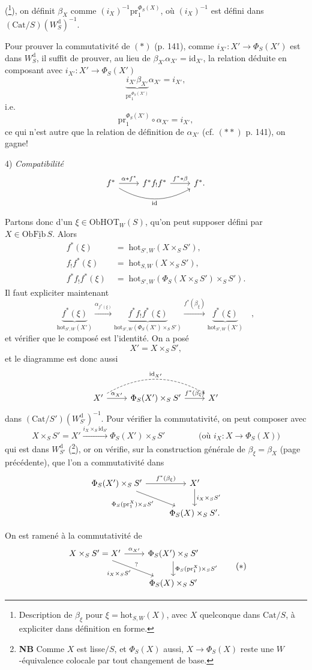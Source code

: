 \documentclass[11pt]{article}
\newcommand{\printedpage}[1]{\marginpar{\footnotesize p.~#1}}
\newcommand{\msp}[1]{\marginpar{\footnotesize [#1]}}
\newcommand{\HOT}{\mathrm{HOT}}
\newcommand{\Cat}{\mathrm{Cat}}
\newcommand{\Ob}{\mathrm{Ob}}
\newcommand{\id}{\mathrm{id}}
\newcommand{\hot}{\mathrm{hot}}
\newcommand{\pr}{\mathrm{pr}}
\newcommand{\Wd}{W^{\mathrm{d}}}
\begin{document}
(\footnote[70]{Description de $\beta_\xi$ pour $\xi=\hot_{S,W}(X)$, avec $X$ quelconque dans $\Cat/S$, à expliciter dans définition en forme.}), on définit $\beta_X$ comme $(i_X)^{-1}\pr_1^{\Phi_S(X)}$, où $(i_X)^{-1}$ est défini dans $(\Cat/S)(\Wd_S)^{-1}$.

Pour prouver la commutativité de $(*)$ (p. 141), comme $i_{X'} : X'\longrightarrow\Phi_S(X')$ est dans $\Wd_S$, il suffit de prouver, au lieu de $\beta_{X'}\alpha_{X'} = \id_{X'}$, la relation déduite en composant avec $i_{X'} : X'\longrightarrow\Phi_S(X')$
\[
\underbrace{i_{X'}\beta_{X'}}_{\pr_1^{\Phi_S(X')}}\alpha_{X'} = i_{X'},
\]
i.e.
\[
\pr_1^{\Phi_S(X')}\circ\alpha_{X'} = i_{X'},
\]
ce qui n'est autre que la relation de définition de $\alpha_{X'}$ (cf. $(**)$ p. 141), on gagne!

4) \textit{Compatibilité}
\[
\begin{tikzcd}
f^* \arrow[r, "\alpha*f^*"] \arrow[rr, bend right, "\id"'] & f^*f_!f^* \arrow[r, "f^**\beta"] & f^*.
\end{tikzcd}
\]

\printedpage{88}
\leavevmode\msp{page 144}Partons donc d'un $\xi\in\Ob\HOT_W(S)$, qu'on peut supposer défini par $X\in\Ob\underline{\mathrm{Fib}}\,S$. Alors
\[
\begin{aligned}
f^*(\xi) &\;=\; \hot_{S',W}(X\times_S S'),\\
f_!f^*(\xi) &\;=\; \hot_{S,W}(X\times_S S'),\\
f^*f_!f^*(\xi) &\;=\; \hot_{S',W}(\Phi_S(X\times_S S')\times_S S').
\end{aligned}
\]
Il faut expliciter maintenant
\[
\underbrace{f^*(\xi)}_{\hot_{S',W}(X')} \xrightarrow{\alpha_{f^*(\xi)}} \underbrace{f^*f_!f^*(\xi)}_{\hot_{S',W}(\Phi_S(X')\times_S S')} \xrightarrow{f^*(\beta_\xi)} \underbrace{f^*(\xi)}_{\hot_{S',W}(X')} \quad ,
\]
et vérifier que le composé est l'identité. On a posé
\[
X' = X\times_S S',
\]
et le diagramme est donc aussi
\[
\begin{tikzcd}
X' \arrow[r, "{\alpha_{X'}}"] \arrow[rr, bend left, dashed, "{\id_{X'}}"] & \Phi_S(X')\times_S S' \arrow[r, "f^*(\beta_\xi)"] & X' %
\end{tikzcd}
\]
dans $(\Cat/S')(\Wd_{S'})^{-1}$. Pour vérifier la commutativité, on peut composer avec
\[
X\times_S S' = X' \xrightarrow{i_X\times_S\id_{S'}} \Phi_S(X')\times_S S' \qquad\qquad \text{(où } i_X : X\longrightarrow\Phi_S(X)\text{)}
\]
qui est dans $\Wd_{S'}$ (\footnote[71]{\textbf{NB} Comme $X$ est lisse$/S$, et $\Phi_S(X)$ aussi, $X\longrightarrow\Phi_S(X)$ reste une $W$-équivalence colocale par tout changement de base.}), or on vérifie, sur la construction générale de $\beta_\xi=\beta_X$ (page précédente), que l'on a commutativité dans
\[
\begin{tikzcd}
\Phi_S(X')\times_S S' \arrow[r, "f^*(\beta_\xi)"] \arrow[dr, "\Phi_S(\pr_1^X)\times_S S'"'] & X' \arrow[d, "i_X\times_S S'"] \\
 & \Phi_S(X)\times_S S'.
\end{tikzcd}
\]

\leavevmode\msp{page 145}On est ramené à la commutativité de
\[
\begin{tikzcd}
X\times_S S' = X' \arrow[r, "{\alpha_{X'}}"] \arrow[dr, "i_X\times_S S'"', "?"] & \Phi_S(X')\times_S S' \arrow[d, "\Phi_S(\pr_1^X)\times_S S'"] \\
 & \Phi_S(X)\times_S S'
\end{tikzcd}
\tag*{$(*)$}
\]
\end{document}
